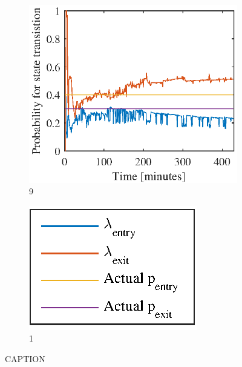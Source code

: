 \begin{figure}[htbp]
	\begin{subfigure}[t]{0.5\linewidth}
		\centering
		\includegraphics[width=1\linewidth]{chapters/appendix/figures/learning_curves/obs9}
		\caption{9}
	\end{subfigure}
	\hspace*{\fill}
	\begin{subfigure}[t]{0.5\linewidth}
		\centering
		\includegraphics[scale = 1]{chapters/appendix/figures/learning_curves/legend}
		\caption{1}
	\end{subfigure}

	\caption{CAPTION}
	\label{fig:all_learnings_sim_2}
\end{figure}